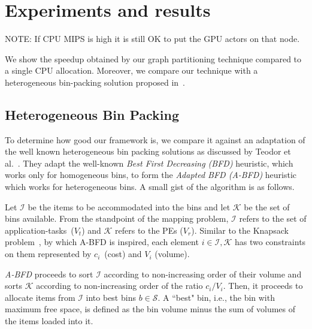 
\section{Experiments and results}
\label{sec:experiments-results}
NOTE: If CPU MIPS is high it is still OK to put the GPU actors on that
node.

We show the speedup obtained by our graph partitioning technique
compared to a single CPU allocation. Moreover, we compare our technique
with a heterogeneous bin-packing solution proposed in~\cite{mmar11}.


\subsection{Heterogeneous Bin Packing}

To determine how good our framework is, we compare it against an
adaptation of the well known heterogeneous bin packing solutions as
discussed by Teodor et al.~\cite{tcra11}. They adapt the well-known
\textit{Best First Decreasing (BFD)} heuristic, which works only for
homogeneous bins, to form the \textit{Adapted BFD (A-BFD)} heuristic
which works for heterogeneous bins. A small gist of the algorithm is as
follows.

Let $\mathcal{I}$ be the items to be accommodated into the bins and let
$\mathcal{K}$ be the set of bins available.  From the standpoint of the
mapping problem, $\mathcal{I}$ refers to the set of
\mbox{application-tasks ($V_t$)} and $\mathcal{K}$ refers to the PEs
($V_r$). Similar to the Knapsack problem~\cite{sski08}, by which A-BFD
is inspired, each element $i \in \mathcal{I}, \mathcal{K}$ has two
constraints on them represented by \mbox{$c_i$ (cost)} and $V_i$
(volume). %

\textit{A-BFD} proceeds to sort $\mathcal{I}$ according to
non-increasing order of their volume and sorts $\mathcal{K}$ according
to non-increasing order of the ratio $c_i/V_i$. Then, it proceeds to
allocate items from $\mathcal{I}$ into best bins $b \in \mathcal{S}$. A
``best" bin, i.e., the bin with maximum free space, is defined as the
bin volume minus the sum of volumes of the items loaded into it. %

